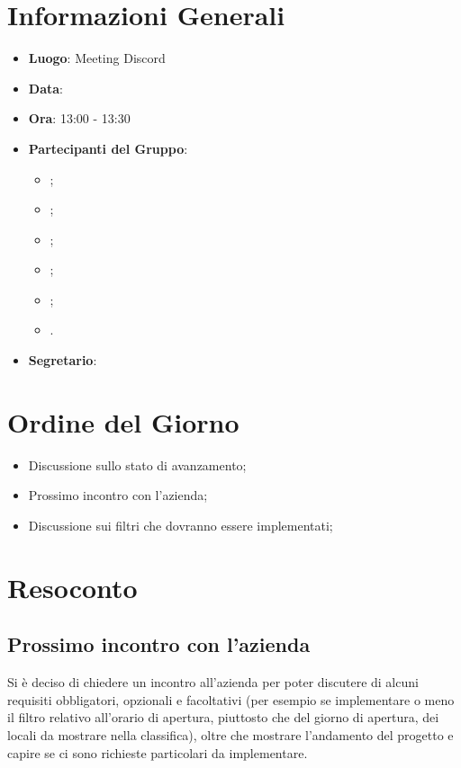 \section{Informazioni Generali}

\begin{itemize}
	\item{\textbf{Luogo}}: Meeting Discord
	\item{\textbf{Data}}: \D
	\item{\textbf{Ora}}: 13:00 - 13:30
	\item{\textbf{Partecipanti del Gruppo}}:
	\begin{itemize}
		\item{\EP{};}
		\item{\FP{};}
		\item{\GC{};}
		\item{\LW{};}
		\item{\MG{};}
		\item{\PV{}.}
	\end{itemize}
	\item{\textbf{Segretario}}: \PV{}
\end{itemize}

\section{Ordine del Giorno}
\begin{itemize}
	\item{Discussione sullo stato di avanzamento;}
	\item{Prossimo incontro con l'azienda;}
	\item{Discussione sui filtri che dovranno essere implementati;}
\end{itemize}

\section{Resoconto}

\subsection{Prossimo incontro con l'azienda}
Si è deciso di chiedere un incontro all'azienda per poter discutere di alcuni requisiti obbligatori, opzionali e facoltativi (per esempio se implementare o meno il filtro relativo all'orario di apertura, piuttosto che del giorno di apertura, dei locali da mostrare nella classifica), oltre che mostrare l'andamento del progetto e capire se ci sono richieste particolari da implementare.


